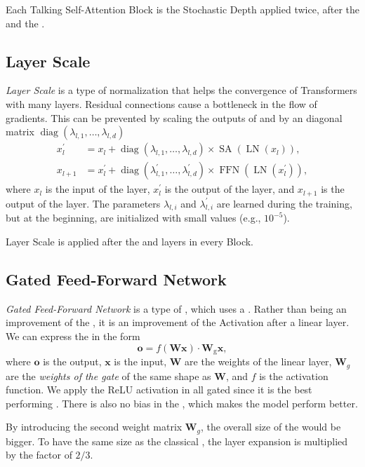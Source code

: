 Each Talking Self-Attention Block is the Stochastic Depth applied twice, after the \MHSA and the \FFN.

\subsection{Layer Scale}
\label{sec:layer_scale}
\emph{Layer Scale} \cite{cait} is a type of normalization that helps the convergence of Transformers with many layers. 
Residual connections cause a bottleneck in the flow of gradients.
This can be prevented by scaling the outputs of \SA and \FFN by an diagonal matrix $\operatorname{diag}\left(\lambda_{l, 1}, \ldots, \lambda_{l, d}\right)$
\begin{equation}
\begin{aligned}
    x_l^{\prime} & =x_l+\operatorname{diag}\left(\lambda_{l, 1}, \ldots, \lambda_{l, d}\right) \times \operatorname{SA}\left(\operatorname{LN}\left(x_l\right)\right), \\
    x_{l+1} & =x_l^{\prime}+\operatorname{diag}\left(\lambda_{l, 1}^{\prime}, \ldots, \lambda_{l, d}^{\prime}\right) \times \operatorname{FFN}\left(\operatorname{LN}\left(x_l^{\prime}\right)\right),
\end{aligned}
\end{equation}
where $x_l$ is the input of the layer, $x_l^{\prime}$ is the output of the \SA layer, and $x_{l+1}$ is the output of the \FFN layer.
The parameters $\lambda_{l, i}$ and $\lambda_{l, i}^{\prime}$ are learned during the training, but at the beginning, are initialized with small values (e.g., $10^{-5}$).

Layer Scale is applied after the \SA and \FFN layers in every \SA Block.

\subsection{Gated Feed-Forward Network}
\label{sec:gated_ffn}
\emph{Gated Feed-Forward Network} is a type of \FFN, which uses a \GLU \cite{GLU}.
Rather than being an improvement of the \FFN, it is an improvement of the Activation after a linear layer.
We can express the \GLU in the form
\begin{equation}
    \pmb{o} = f(\pmb{W} \pmb{x}) \cdot \pmb{W}_{\text{g}} \pmb{x},
\end{equation}
where $\pmb{o}$ is the output, $\pmb{x}$ is the input, $\pmb{W}$ are the weights of the linear layer, $\pmb{W}_g$ are the \emph{weights of the gate} of the same shape as $\pmb{W}$, and $f$ is the activation function.
We apply the ReLU activation in all gated \FFN since it is the best performing \cite{GLU}.
There is also no bias in the \GLU, which makes the model perform better.

By introducing the second weight matrix $\pmb{W}_g$, the overall size of the \FFN would be bigger.
To have the same size as the classical \FFN, the layer expansion is multiplied by the factor of $2/3$.


